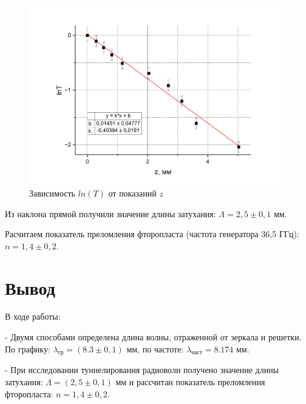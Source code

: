 \documentclass[a4paper,12pt]{article} %
\begin{document}
\medskip

\begin{figure}[h!]
    \centering
    \includegraphics[width=16cm]{graph3.PNG}
    \caption{Зависимость $ln(T)$ от показаний $z$}
\end{figure}

\noindent Из наклона прямой получили значение длины затухания: $\Lambda = 2,5 \pm 0,1$ мм.

\medskip

\noindent Расчитаем показатель преломления фторопласта (частота генератора 36,5 ГГц): $n = 1,4 \pm 0,2$.\\

\section{Вывод}

\noindent В ходе работы:

\medskip

- Двумя способами определена длина волны, отраженной от зеркала и решетки. По графику: $\lambda_\text{гр} = (8.3 \pm 0,1 )$ мм, по частоте: $\lambda_\text{част} = 8.174$ мм.

\medskip

- При исследовании туннелирования радиоволн получено значение длины затухания: $\Lambda = (2,5 \pm 0,1)$ мм и рассчитан показатель преломления фторопласта: $n = 1,4 \pm 0,2$.
\end{document}
